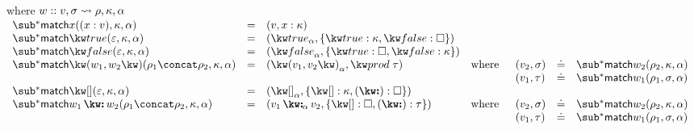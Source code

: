\flushleft {}
 where $w :: v, \sigma \rightsquigarrow \rho, \kappa, \alpha$ \\
 \small
\vspace{3mm}
$\begin{array}{lllll}
   \matchBwdF{\matchVarNew{x}}(\bind{x}{v}, \kappa, \alpha)
   &=&
   (v, \elimVar{x}{\kappa})
   \\
   \matchBwdF{\matchTrueNew}(\seqEmpty, \kappa, \alpha)
   &=&
   (\annTrue{\alpha}, \elimBool{\kappa}{\hole})
   \\
   \matchBwdF{\matchFalseNew}(\seqEmpty, \kappa, \alpha)
   &=&
   (\annFalse{\alpha}, \elimBool{\hole}{\kappa})
   \\
   \matchBwdF{\matchPair{w_1}{w_2}}(\rho_1 \concat \rho_2, \kappa, \alpha)
   &=&
   (\annPair{v_1}{v_2}{\alpha}, \elimProd{\tau})
   &\text{where}&
   \begin{array}[t]{lll}
      (v_2, \sigma) &\eq& \matchBwdF{w_2}(\rho_2, \kappa, \alpha)
      \\
      (v_1, \tau) &\eq& \matchBwdF{w_1}(\rho_1, \sigma, \alpha)
   \end{array}
   \\
   \matchBwdF{\matchNilNew}(\seqEmpty,\kappa,\alpha)
   &=&
   (\annNil{\alpha}, \elimList{\kappa}{\hole})
   \\
   \matchBwdF{\matchConsNew{w_1}{w_2}}(\rho_1 \concat \rho_2, \kappa, \alpha)
   &=&
   (\annCons{v_1}{v_2}{\alpha}, \elimList{\hole}{\tau})
   &\text{where}&
   \begin{array}[t]{lll}
      (v_2, \sigma) &\eq& \matchBwdF{w_2}(\rho_2, \kappa, \alpha)
      \\
      (v_1, \tau) &\eq& \matchBwdF{w_1}(\rho_1, \sigma, \alpha)
   \end{array}
\end{array}$
